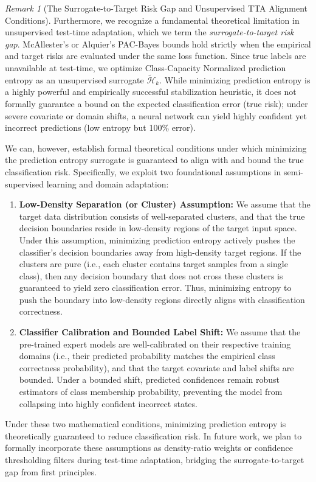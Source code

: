 \documentclass{article}
\theoremstyle{plain}
\theoremstyle{definition}
\theoremstyle{remark}
\newtheorem{remark}{Remark}
\begin{document}
\begin{remark}[The Surrogate-to-Target Risk Gap and Unsupervised TTA Alignment Conditions]
Furthermore, we recognize a fundamental theoretical limitation in unsupervised test-time adaptation, which we term the \emph{surrogate-to-target risk gap}. McAllester's or Alquier's PAC-Bayes bounds hold strictly when the empirical and target risks are evaluated under the same loss function. Since true labels are unavailable at test-time, we optimize Class-Capacity Normalized prediction entropy as an unsupervised surrogate $\tilde{\mathcal{H}}_k$. While minimizing prediction entropy is a highly powerful and empirically successful stabilization heuristic, it does not formally guarantee a bound on the expected classification error (true risk); under severe covariate or domain shifts, a neural network can yield highly confident yet incorrect predictions (low entropy but 100\% error).

We can, however, establish formal theoretical conditions under which minimizing the prediction entropy surrogate is guaranteed to align with and bound the true classification risk. Specifically, we exploit two foundational assumptions in semi-supervised learning and domain adaptation:
\begin{enumerate}
    \item \textbf{Low-Density Separation (or Cluster) Assumption:} We assume that the target data distribution consists of well-separated clusters, and that the true decision boundaries reside in low-density regions of the target input space. Under this assumption, minimizing prediction entropy actively pushes the classifier's decision boundaries away from high-density target regions. If the clusters are pure (i.e., each cluster contains target samples from a single class), then any decision boundary that does not cross these clusters is guaranteed to yield zero classification error. Thus, minimizing entropy to push the boundary into low-density regions directly aligns with classification correctness.
    \item \textbf{Classifier Calibration and Bounded Label Shift:} We assume that the pre-trained expert models are well-calibrated on their respective training domains (i.e., their predicted probability matches the empirical class correctness probability), and that the target covariate and label shifts are bounded. Under a bounded shift, predicted confidences remain robust estimators of class membership probability, preventing the model from collapsing into highly confident incorrect states. 
\end{enumerate}
Under these two mathematical conditions, minimizing prediction entropy is theoretically guaranteed to reduce classification risk. In future work, we plan to formally incorporate these assumptions as density-ratio weights or confidence thresholding filters during test-time adaptation, bridging the surrogate-to-target gap from first principles.
\end{remark}
\end{document}
